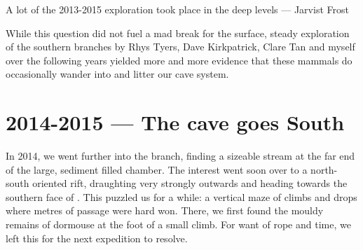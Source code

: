 \begin{marginfigure}
	\checkoddpage \ifoddpage \forcerectofloat \else \forceversofloat \fi
	\centering	{} 
  	\caption{A lot of the 2013-2015 exploration took place in the deep \protect{} levels --- Jarvist Frost}
	\end{marginfigure}


While this question did not fuel a mad break for the surface, steady exploration of the southern branches by Rhys Tyers, Dave Kirkpatrick, Clare Tan and myself over the following years yielded more and more evidence that these mammals do occasionally wander into and litter our cave system.

\section{2014-2015 --- The cave goes South}

In 2014, we went further into the  branch, finding a sizeable stream at the far end of the large, sediment filled  chamber. The interest went soon over to a north-south oriented rift, draughting very strongly outwards and heading towards the southern face of . This puzzled us for a while: a vertical maze of climbs and drops where metres of passage were hard won. There, we first found the mouldy remains of dormouse at the foot of a small climb. For want of rope and time, we left this for the next expedition to resolve.



